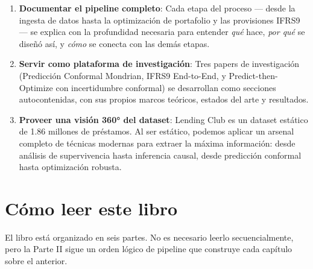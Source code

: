\documentclass[
  spanish,
  11pt,
  letterpaper,
]{scrbook}
\theoremstyle{plain}
\theoremstyle{remark}
\begin{document}
\begin{enumerate}
\def\labelenumi{\arabic{enumi}.}
\item
  \textbf{Documentar el pipeline completo}: Cada etapa del proceso ---
  desde la ingesta de datos hasta la optimización de portafolio y las
  provisiones IFRS9 --- se explica con la profundidad necesaria para
  entender \emph{qué} hace, \emph{por qué} se diseñó así, y \emph{cómo}
  se conecta con las demás etapas.
\item
  \textbf{Servir como plataforma de investigación}: Tres papers de
  investigación (Predicción Conformal Mondrian, IFRS9 End-to-End, y
  Predict-then-Optimize con incertidumbre conformal) se desarrollan como
  secciones autocontenidas, con sus propios marcos teóricos, estados del
  arte y resultados.
\item
  \textbf{Proveer una visión 360° del dataset}: Lending Club es un
  dataset estático de 1.86 millones de préstamos. Al ser estático,
  podemos aplicar un arsenal completo de técnicas modernas para extraer
  la máxima información: desde análisis de supervivencia hasta
  inferencia causal, desde predicción conformal hasta optimización
  robusta.
\end{enumerate}

\section{Cómo leer este libro}\label{cuxf3mo-leer-este-libro}

El libro está organizado en seis partes. No es necesario leerlo
secuencialmente, pero la Parte II sigue un orden lógico de pipeline que
construye cada capítulo sobre el anterior.
\end{document}
